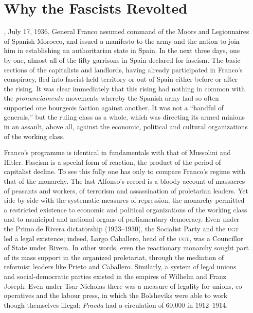 \chapter{Why the Fascists Revolted}

, July 17, 1936, General Franco assumed command of the Moors and Legionnaires of Spanish Morocco, and issued a manifesto to the army and the nation to join him in establishing an authoritarian state in Spain. In the next three days, one by one, almost all of the fifty garrisons in Spain declared for fascism. The basic sections of the capitalists and landlords, having already participated in Franco’s conspiracy, fled into fascist-held territory or out of Spain either before or after the rising. It was clear immediately that this rising had nothing in common with the \emph{pronunciamento} movements whereby the Spanish army had so often supported one bourgeois faction against another. It was not a ``handful of generals,'' but the ruling class as a whole, which was directing its armed minions in an assault, above all, against the economic, political and cultural organizations of the working class.

Franco’s programme is identical in fundamentals with that of Mussolini and Hitler. Fascism is a special form of reaction, the product of the period of capitalist decline. To see this fully one has only to compare Franco’s regime with that of the monarchy. The last Alfonso’s record is a bloody account of massacres of peasants and workers, of terrorism and assassination of proletarian leaders. Yet side by side with the systematic measures of repression, the monarchy permitted a restricted existence to economic and political organizations of the working class and to municipal and national organs of parliamentary democracy. Even under the Primo de Rivera dictatorship (1923--1930), the Socialist Party and the \textsc{ugt} led a legal existence; indeed, Largo Caballero, head of the \textsc{ugt}, was a Councillor of State under Rivera. In other words, even the reactionary monarchy sought part of its mass support in the organized proletariat, through the mediation of reformist leaders like Prieto and Caballero. Similarly, a system of legal unions and social-democratic parties existed in the empires of Wilhelm and Franz Joseph. Even under Tsar Nicholas there was a measure of legality for unions, co-operatives and the labour press, in which the Bolsheviks were able to work though themselves illegal: \emph{Pravda} had a circulation of 60,000 in 1912--1914.

